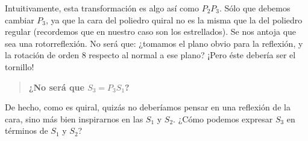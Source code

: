 \documentclass[spanish]{article}
\theoremstyle{definition}
\begin{document}
	Intuitivamente, esta transformación es algo así como $P_2P_3$. Sólo que debemos cambiar $P_3$, ya que la cara del poliedro quiral no es la misma que la del poliedro regular (recordemos que en nuestro caso son los estrellados). Se nos antoja que sea una rotorreflexión. No será que: ¿tomamos el plano obvio para la reflexión, y la rotación de orden 8 respecto al normal a ese plano? ¡Pero éste debería ser el tornillo!
	
	\begin{quotation}\textbf{¿No será que $S_3=P_3S_1$?}\end{quotation}
	
	De hecho, como es quiral, quizás no deberíamos pensar en una reflexión de la cara, sino más bien inspirarnos en las $S_1$ y $S_2$. ¿Cómo podemos expresar $S_3$ en términos de $S_1$ y $S_2$?
	
\end{document}
